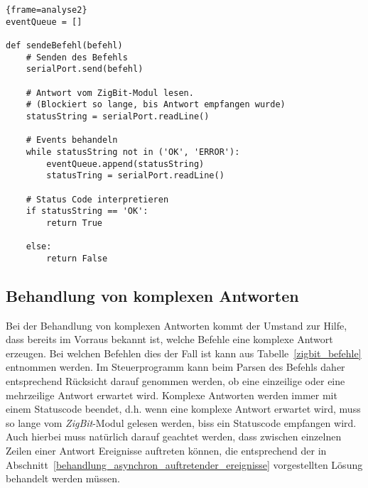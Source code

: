             \begin{lstlisting}{frame=analyse2}
eventQueue = []

def sendeBefehl(befehl)
    # Senden des Befehls
    serialPort.send(befehl)

    # Antwort vom ZigBit-Modul lesen.
    # (Blockiert so lange, bis Antwort empfangen wurde)
    statusString = serialPort.readLine()

    # Events behandeln 
    while statusString not in ('OK', 'ERROR'):
        eventQueue.append(statusString)
        statusTring = serialPort.readLine()

    # Status Code interpretieren
    if statusString == 'OK':
        return True
    
    else:
        return False
            \end{lstlisting}

        \subsection{Behandlung von komplexen Antworten}
            \label{behandlung_von_komplexen_antworten}
            Bei der Behandlung von komplexen Antworten kommt der Umstand zur Hilfe, dass bereits
            im Vorraus bekannt ist, welche Befehle eine komplexe Antwort erzeugen. Bei welchen Befehlen dies
            der Fall ist kann aus Tabelle~\ref{zigbit_befehle} entnommen werden. Im Steuerprogramm kann beim
            Parsen des Befehls daher entsprechend Rücksicht darauf genommen werden, ob eine einzeilige oder
            eine mehrzeilige Antwort erwartet wird. Komplexe Antworten werden immer mit einem Statuscode
            beendet, d.h. wenn eine komplexe Antwort erwartet wird, muss so lange vom \emph{ZigBit}-Modul
            gelesen werden, biss ein Statuscode empfangen wird. Auch hierbei muss natürlich darauf geachtet
            werden, dass zwischen einzelnen Zeilen einer Antwort Ereignisse auftreten können, die entsprechend
            der in Abschnitt~\ref{behandlung_asynchron_auftretender_ereignisse} vorgestellten Lösung behandelt 
            werden müssen.

